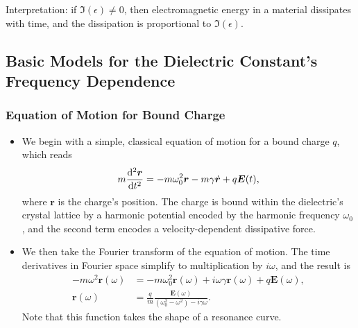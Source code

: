 \documentclass[11pt, a4paper]{article}
\renewcommand{\vec}[1]{\bm{#1}} %
\renewcommand{\r}{\vec{r}}
\newcommand{\E}{\vec{E}} %
\begin{document}
\begin{itemize}
    Interpretation: if $ \Im(\epsilon) \neq 0 $, then electromagnetic energy in a material dissipates with time, and the dissipation is proportional to $ \Im(\epsilon) $.

\end{itemize}
    
\subsection{Basic Models for the Dielectric Constant's Frequency Dependence}

\subsubsection{Equation of Motion for Bound Charge}
\begin{itemize}

    \item We begin with a simple, classical equation of motion for a bound charge $ q $, which reads
    \begin{equation*}
        m \dv[2]{\r}{t} = - m \omega_{0}^{2}\r - m\gamma \dot{\r} + q\E(t),
    \end{equation*}
    where $ \r $ is the charge's position. The charge is bound within the dielectric's crystal lattice by a harmonic potential encoded by the harmonic frequency $ \omega_{0} $, and the second term encodes a velocity-dependent dissipative force. 

    \item We then take the Fourier transform of the equation of motion. The time derivatives in Fourier space simplify to multiplication by $ i\omega $, and the result is
    \begin{align*}
        -m\omega^{2}\r(\omega) &= - m\omega_{0}^{2}\r(\omega) + i\omega\gamma\r(\omega) + q\E(\omega),\\
        \r(\omega) &= \frac{q}{m} \frac{\E(\omega)}{(\omega_{0}^{2} - \omega^{2}) - i \gamma\omega}.
    \end{align*}
    Note that this function takes the shape of a resonance curve. 


\end{itemize}
\end{document}
